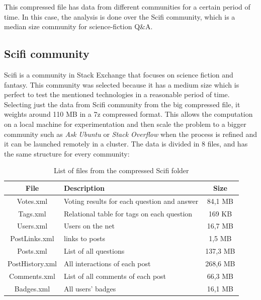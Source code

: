 \documentclass[11pt]{book} %
\begin{document}
    This compressed file has data from different communities for a certain period of time. In this case, the analysis is done over the Scifi community, which is a median size community for science-fiction Q\&A.

    \subsection{Scifi community}

    Scifi is a community in Stack Exchange that focuses on science fiction and fantasy. This community was selected because it has a medium size which is perfect to test the mentioned technologies in a reasonable period of time. Selecting just the data from Scifi community from the big compressed file, it weights around 110 MB in a 7z compressed format. This allows the computation on a local machine for experimentation and then scale the problem to a bigger community such as \emph{Ask Ubuntu} or \emph{Stack Overflow} when the process is refined and it can be launched remotely in a cluster. The data is divided in 8 files, and has the same structure for every community:

    \begin{table}[!ht]
      \centering
      \begin{tabular}{|c|p{}|c|}
        \hline

        File & Description & Size \\ \hline
        Votes.xml & Voting results for each question and answer & 84,1 MB \\ \hline
        Tags.xml & Relational table for tags on each question & 169 KB \\ \hline
        Users.xml & Users on the net & 16,7 MB \\ \hline
        PostLinks.xml & links to posts & 1,5 MB \\ \hline
        Posts.xml & List of all questions & 137,3 MB \\ \hline
        PostHistory.xml & All interactions of each post & 268,6 MB \\ \hline
        Comments.xml & List of all comments of each post & 66,3 MB \\ \hline
        Badges.xml & All users' badges & 16,1 MB \\

        \hline
      \end{tabular}
      \caption{List of files from the compressed Scifi folder}
      \label{tab:list_of_files}
    \end{table}
\end{document}
